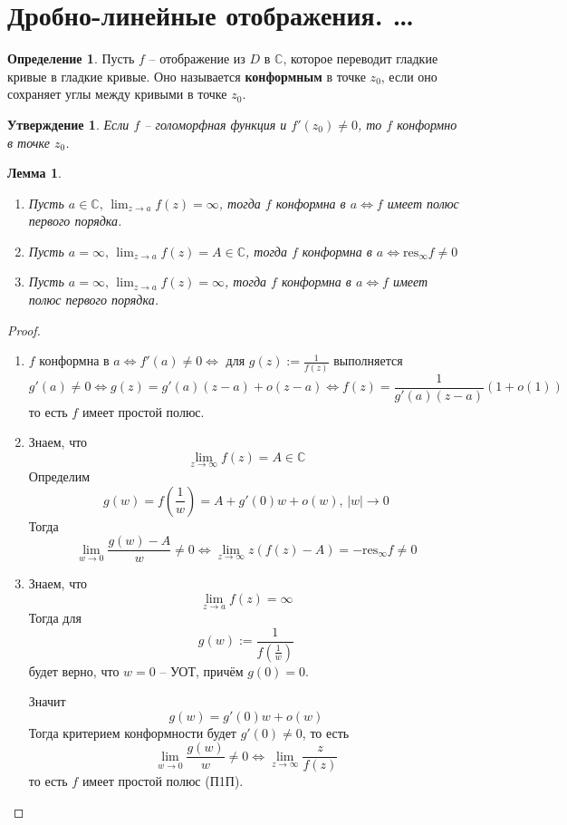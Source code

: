 \documentclass[a4paper,12pt]{article}
\theoremstyle{plain}
\newtheorem{lemma}{Лемма}[section]
\newtheorem{proposition}{Утверждение}[section]
\theoremstyle{definition}
\newtheorem{definition}{Определение}[section]
\theoremstyle{remark}
\begin{document}
\section{Дробно-линейные отображения. \dots}
\begin{definition}
	Пусть $f$ -- отображение из $D$ в $\mathbb{C}$, которое переводит гладкие кривые в гладкие кривые. Оно называется \textbf{конформным} в точке $z_0$, если оно сохраняет углы между кривыми в точке $z_0$.
\end{definition}

\begin{proposition}
	Если $f$ -- голоморфная функция и $f'(z_0) \neq 0$, то $f$ конформно в точке $z_0$.
\end{proposition}

\begin{lemma}
	\begin{enumerate}
		\item Пусть $a \in \mathbb{C},\, \lim_{z \to a}f(z) = \infty$, тогда $f$ конформна в $a \Leftrightarrow f$ имеет полюс первого порядка.
		\item Пусть $a = \infty,\, \lim_{z \to a}f(z) = A \in \mathbb{C}$, тогда $f$ конформна в $a \Leftrightarrow \text{res}_\infty f \neq 0$
		\item Пусть $a = \infty,\, \lim_{z \to a}f(z) = \infty$, тогда $f$ конформна в $a \Leftrightarrow f$ имеет полюс первого порядка.
	\end{enumerate}
\end{lemma}

\begin{proof}
	\begin{enumerate}
		\item $f$ конформна в $a \Leftrightarrow f'(a) \neq 0 \Leftrightarrow $ для $g(z) := \frac{1}{f(z)}$ выполняется
		      \[
			      g'(a) \neq 0 \Leftrightarrow g(z) = g'(a)(z - a) + o(z - a) \Leftrightarrow f(z) = \frac{1}{g'(a)(z - a)}(1 + o(1))
		      \]
		      то есть $f$ имеет простой полюс.
		\item Знаем, что
		      \[
			      \lim_{z \to \infty} f(z) = A \in \mathbb{C}
		      \]
		      Определим
		      \[
			      g(w) = f\left(\frac{1}{w}\right) = A + g'(0)w + o(w),\, \vert w\vert \to 0
		      \]
		      Тогда
		      \[
			      \lim_{w \to 0}\frac{g(w) - A}{w} \neq 0 \Leftrightarrow \lim_{z \to \infty}z(f(z) - A) = -\text{res}_\infty f \neq 0
		      \]
		\item Знаем, что
		      \[
			      \lim_{z \to a} f(z) = \infty
		      \]
		      Тогда для
		      \[
			      g(w) := \frac{1}{f(\frac{1}{w})}
		      \]
		      будет верно, что $w = 0$ -- УОТ, причём $g(0) = 0$.

		      Значит
		      \[
			      g(w) = g'(0)w + o(w)
		      \]
		      Тогда критерием конформности будет $g'(0) \neq 0$, то есть
		      \[
			      \lim_{w \to 0}\frac{g(w)}{w} \neq 0 \Leftrightarrow \lim_{z \to \infty}\frac{z}{f(z)}
		      \]
		      то есть $f$ имеет простой полюс (П1П).
	\end{enumerate}
\end{proof}
\end{document}
